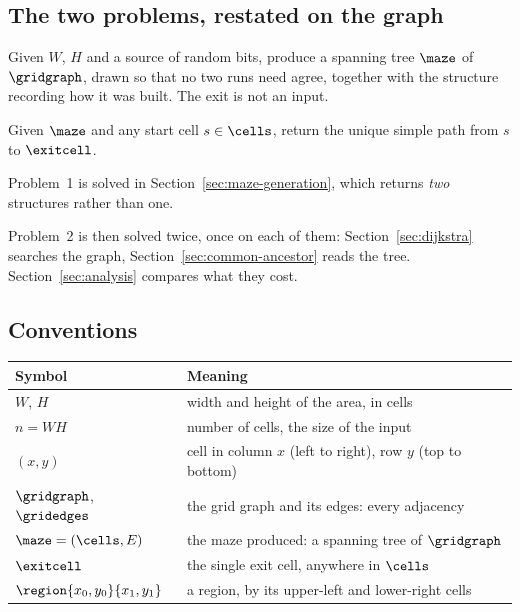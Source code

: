 \subsection{The two problems, restated on the graph}

\begin{description}[leftmargin=*,style=nextline,itemsep=5pt]
  \item[Problem 1 --- Generation.] Given $W$, $H$ and a source of random bits,
    produce a spanning tree $\maze$ of $\gridgraph$, drawn so that no two runs
    need agree, together with the structure recording how it was built. The
    exit is not an input.
  \item[Problem 2 --- Escape.] Given $\maze$ and any start cell $s\in\cells$,
    return the unique simple path from $s$ to $\exitcell$.
\end{description}

Problem~1 is solved in Section~\ref{sec:maze-generation}, which returns
\emph{two} structures rather than one.

Problem~2 is then solved twice, once on each of them:
Section~\ref{sec:dijkstra} searches the graph, Section~\ref{sec:common-ancestor}
reads the tree. Section~\ref{sec:analysis} compares what they cost.

\subsection{Conventions}

\begin{center}
\begin{tabular}{@{}ll@{}}
  \toprule
  Symbol & Meaning \\
  \midrule
  $W$, $H$            & width and height of the area, in cells \\
  $n=WH$              & number of cells, the size of the input \\
  $(x,y)$             & cell in column $x$ (left to right), row $y$ (top to bottom) \\
  $\gridgraph$, $\gridedges$ & the grid graph and its edges: every adjacency \\
  $\maze=(\cells,E)$  & the maze produced: a spanning tree of $\gridgraph$ \\
  $\exitcell$         & the single exit cell, anywhere in $\cells$ \\
  $\region{x_0,y_0}{x_1,y_1}$ & a region, by its upper-left and lower-right cells \\
  \bottomrule
\end{tabular}
\end{center}


